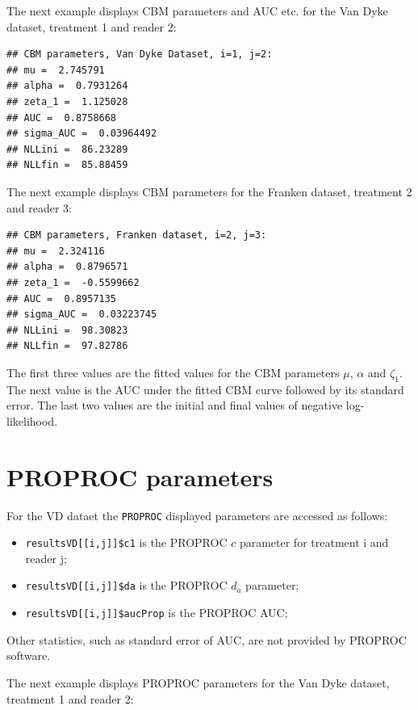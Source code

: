 \documentclass[
]{book}
\providecommand{\tightlist}{%
  \setlength{\itemsep}{0pt}\setlength{\parskip}{0pt}}
\begin{document}
The next example displays CBM parameters and AUC etc. for the Van Dyke dataset, treatment 1 and reader 2:

\begin{verbatim}
## CBM parameters, Van Dyke Dataset, i=1, j=2: 
## mu =  2.745791 
## alpha =  0.7931264 
## zeta_1 =  1.125028 
## AUC =  0.8758668 
## sigma_AUC =  0.03964492 
## NLLini =  86.23289 
## NLLfin =  85.88459
\end{verbatim}

The next example displays CBM parameters for the Franken dataset, treatment 2 and reader 3:

\begin{verbatim}
## CBM parameters, Franken dataset, i=2, j=3: 
## mu =  2.324116 
## alpha =  0.8796571 
## zeta_1 =  -0.5599662 
## AUC =  0.8957135 
## sigma_AUC =  0.03223745 
## NLLini =  98.30823 
## NLLfin =  97.82786
\end{verbatim}

The first three values are the fitted values for the CBM parameters \(\mu\), \(\alpha\) and \(\zeta_1\). The next value is the AUC under the fitted CBM curve followed by its standard error. The last two values are the initial and final values of negative log-likelihood.

\hypertarget{rsm-3-fits-proproc-parameters}{%
\section{PROPROC parameters}\label{rsm-3-fits-proproc-parameters}}

For the VD dataet the \texttt{PROPROC} displayed parameters are accessed as follows:

\begin{itemize}
\tightlist
\item
  \texttt{resultsVD{[}{[}i,j{]}{]}\$c1} is the PROPROC \(c\) parameter for treatment i and reader j;
\item
  \texttt{resultsVD{[}{[}i,j{]}{]}\$da} is the PROPROC \(d_a\) parameter;\\
\item
  \texttt{resultsVD{[}{[}i,j{]}{]}\$aucProp} is the PROPROC AUC;
\end{itemize}

Other statistics, such as standard error of AUC, are not provided by PROPROC software.

The next example displays PROPROC parameters for the Van Dyke dataset, treatment 1 and reader 2:
\end{document}
